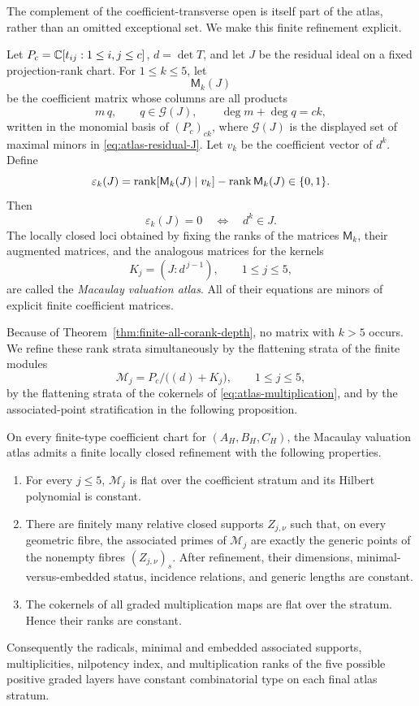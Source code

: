 The complement of the coefficient-transverse open is itself part of
the atlas, rather than an omitted exceptional set.  We make this
finite refinement explicit.

\begin{definition}
\label{def:macaulay-atlas}
Let \(P_c=\mathbb C[t_{ij}:1\le i,j\le c]\), \(d=\det T\), and let \(J\)
be the residual ideal on a fixed projection-rank chart.  For
\(1\le k\le5\), let
\[
 \mathsf M_k(J)
\]
be the coefficient matrix whose columns are all products
\[
 m\,q,\qquad
 q\in\mathcal G(J),\qquad
 \deg m+\deg q=ck,
\]
written in the monomial basis of \((P_c)_{ck}\), where
\(\mathcal G(J)\) is the displayed set of maximal minors in
\eqref{eq:atlas-residual-J}.  Let \(v_k\) be the coefficient vector
of \(d^k\).  Define
\[
 \varepsilon_k(J)=
 \operatorname{rank}[\mathsf M_k(J)\mid v_k]-\operatorname{rank}\mathsf M_k(J)\in\{0,1\}.
\]
Then
\[
 \varepsilon_k(J)=0\quad\Longleftrightarrow\quad d^k\in J.
\]
The locally closed loci obtained by fixing the ranks of the matrices
\(\mathsf M_k\), their augmented matrices, and the analogous matrices
for the kernels
\[
 K_j=(J:d^{\,j-1}),\qquad1\le j\le5,
\]
are called the \emph{Macaulay valuation atlas}.  All of their
equations are minors of explicit finite coefficient matrices.
\end{definition}

Because of Theorem~\ref{thm:finite-all-corank-depth}, no matrix with
\(k>5\) occurs.  We refine these rank strata simultaneously by the
flattening strata of the finite modules
\[
 \mathcal M_j=P_c/\bigl((d)+K_j\bigr),\qquad 1\le j\le5,
\]
by the flattening strata of the cokernels of
\eqref{eq:atlas-multiplication}, and by the associated-point
stratification in the following proposition.

\begin{proposition}
\label{prop:associated-prime-refinement}
On every finite-type coefficient chart for
\((A_H,B_H,C_H)\), the Macaulay valuation atlas admits a finite
locally closed refinement with the following properties.
\begin{enumerate}
\item For every \(j\le5\), \(\mathcal M_j\) is flat over the
coefficient stratum and its Hilbert polynomial is constant.
\item There are finitely many relative closed supports
\(Z_{j,\nu}\) such that, on every geometric fibre, the associated
primes of \(\mathcal M_j\) are exactly the generic points of the
nonempty fibres \((Z_{j,\nu})_s\).  After refinement, their
dimensions, minimal-versus-embedded status, incidence relations, and
generic lengths are constant.
\item The cokernels of all graded multiplication maps are flat over
the stratum.  Hence their ranks are constant.
\end{enumerate}
Consequently the radicals, minimal and embedded associated supports,
multiplicities, nilpotency index, and multiplication ranks of the five
possible positive graded layers have constant combinatorial type on
each final atlas stratum.
\end{proposition}

